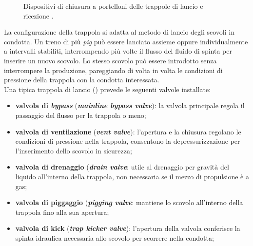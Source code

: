 \begin{figure}[htbp]
    \centering
     \qquad
\caption{Dispositivi di chiusura a portelloni delle trappole di lancio e ricezione \parencite{williamson2015guide}.}
\label{fig:chiusuratrappola}
\end{figure}
La configurazione della trappola si adatta al metodo di lancio degli scovoli in condotta. Un treno di più \textit{pig} può essere lanciato assieme oppure individualmente a intervalli stabiliti, interrompendo più volte il flusso del fluido di spinta per inserire un nuovo scovolo. Lo stesso scovolo può essere introdotto senza interrompere la produzione, pareggiando di volta in volta le condizioni di pressione della trappola con la condotta interessata.\\
Una tipica trappola di lancio () prevede le seguenti valvole installate:
\begin{itemize}
    \item \textbf{valvola di \textit{bypass}} (\textbf{\textit{mainline bypass valve}}): la valvola principale regola il passaggio del flusso per la trappola o meno;
    \item \textbf{valvola di ventilazione} (\textit{\textbf{vent valve}}): l'apertura e la chiusura regolano le condizioni di pressione nella trappola, consentono la depressurizzazione per l'inserimento dello scovolo in sicurezza;
    \item \textbf{valvola di drenaggio} (\textit{\textbf{drain valve}}: utile al drenaggio per gravità del liquido all'interno della trappola, non necessaria se il mezzo di propulsione è a gas;
    \item \textbf{valvola di piggaggio} (\textit{\textbf{pigging valve}}: mantiene lo scovolo all'interno della trappola fino alla sua apertura; 
    \item \textbf{valvola di kick} (\textit{\textbf{trap kicker valve}}): l'apertura della valvola conferisce la spinta idraulica necessaria allo scovolo per scorrere nella condotta;
\end{itemize}


